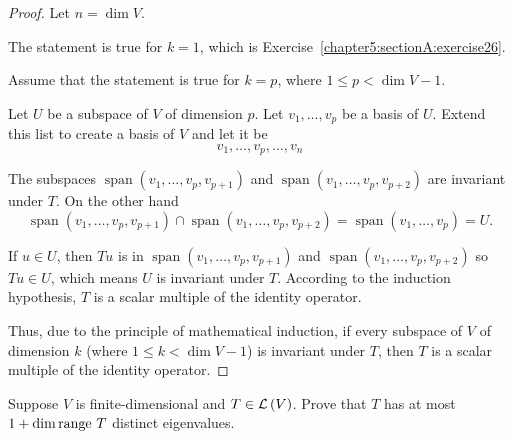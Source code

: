 \begin{proof}
    Let $n = \dim V$.

    The statement is true for $k = 1$, which is Exercise~\ref{chapter5:sectionA:exercise26}.

    Assume that the statement is true for $k = p$, where $1\leq p < \dim V - 1$.

    Let $U$ be a subspace of $V$ of dimension $p$. Let $v_{1}, \ldots, v_{p}$ be a basis of $U$. Extend this list to create a basis of $V$ and let it be
    \[
        v_{1}, \ldots, v_{p}, \ldots, v_{n}
    \]

    The subspaces $\operatorname{span}(v_{1}, \ldots, v_{p}, v_{p+1})$ and $\operatorname{span}(v_{1}, \ldots, v_{p}, v_{p+2})$ are invariant under $T$. On the other hand
    \[
        \operatorname{span}(v_{1}, \ldots, v_{p}, v_{p+1})\cap \operatorname{span}(v_{1}, \ldots, v_{p}, v_{p+2}) = \operatorname{span}(v_{1}, \ldots, v_{p}) = U.
    \]

    If $u\in U$, then $Tu$ is in $\operatorname{span}(v_{1}, \ldots, v_{p}, v_{p+1})$ and $\operatorname{span}(v_{1}, \ldots, v_{p}, v_{p+2})$ so $Tu\in U$, which means $U$ is invariant under $T$. According to the induction hypothesis, $T$ is a scalar multiple of the identity operator.

    Thus, due to the principle of mathematical induction, if every subspace of $V$ of dimension $k$ (where $1\leq k < \dim V - 1$) is invariant under $T$, then $T$ is a scalar multiple of the identity operator.
\end{proof}
\newpage

\begin{exercise}
    Suppose $V$ is finite-dimensional and $T\in \mathcal{L}\left({V}\right)$. Prove that $T$ has at most $1 + \dim\operatorname{range}\,{T}$ distinct eigenvalues.
\end{exercise}

